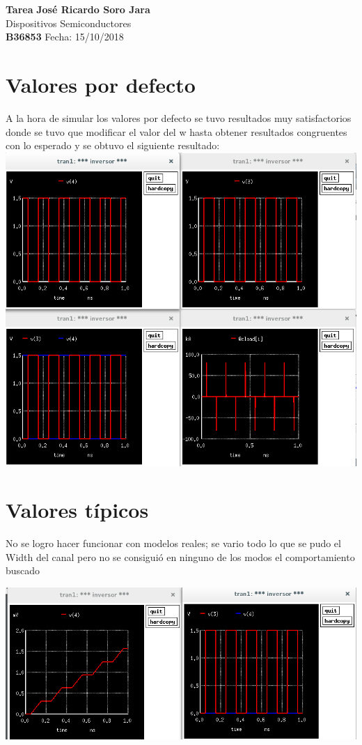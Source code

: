 \documentclass[a4paper, 11pt]{article}
\begin{document}
\noindent
\large\textbf{Tarea} \hfill \textbf{José Ricardo Soro Jara} \\
\normalsize Dispositivos Semiconductores \hfill  \\ \textbf{B36853}
\hfill Fecha: 15/10/2018 \\

\section*{Valores por defecto}
A la hora de simular los valores por defecto se tuvo resultados muy satisfactorios donde se tuvo que modificar el valor del w hasta obtener resultados congruentes con lo esperado y se obtuvo el siguiente resultado:
\includegraphics[scale=0.420]{def.png}

\section*{Valores típicos}
No se logro hacer funcionar con modelos reales; se vario todo lo que se pudo el Width del canal pero no se consiguió en ninguno de los modos el comportamiento buscado

\includegraphics[scale=0.420]{typReal.png}
\end{document}
